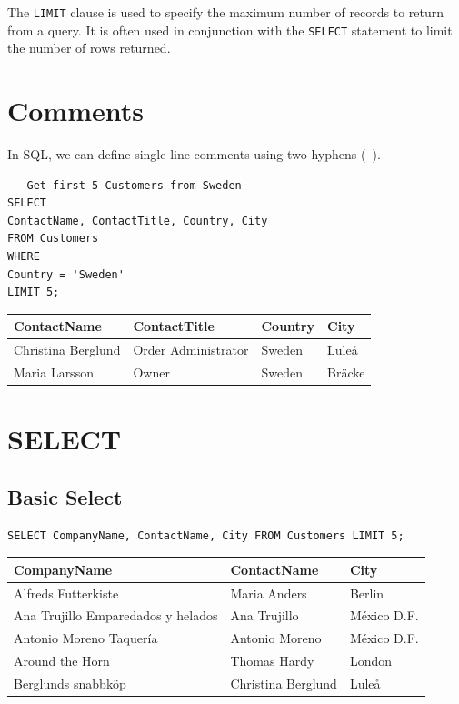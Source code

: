 \documentclass[10pt]{article}
\begin{document}
The \texttt{LIMIT} clause is used to specify the maximum number of records to return from a query. 
It is often used in conjunction with the \texttt{SELECT} statement to limit the number of rows returned.


\section{Comments}

In SQL, we can define single-line comments using two hyphens (\texttt{--}).

\begin{verbatim}
-- Get first 5 Customers from Sweden
SELECT 
ContactName, ContactTitle, Country, City 
FROM Customers 
WHERE
Country = 'Sweden'
LIMIT 5;
\end{verbatim}

\begin{table}[H]
\begin{tabular}{|l|l|l|l|}
\hline
ContactName & ContactTitle & Country & City \\
\hline
Christina Berglund & Order Administrator & Sweden & Luleå \\
Maria Larsson & Owner & Sweden & Bräcke \\
\hline
\end{tabular}
\end{table}


\section{SELECT}

\subsection{Basic Select}
\begin{verbatim}
SELECT CompanyName, ContactName, City FROM Customers LIMIT 5;
\end{verbatim}

\begin{table}[H]
\begin{tabular}{|l|l|l|}
\hline
CompanyName	& ContactName	& City \\
\hline
Alfreds Futterkiste	& Maria Anders	& Berlin \\
Ana Trujillo Emparedados y helados	& Ana Trujillo	& México D.F. \\
Antonio Moreno Taquería	& Antonio Moreno	& México D.F. \\
Around the Horn	& Thomas Hardy	& London \\
Berglunds snabbköp	& Christina Berglund	& Luleå \\
\hline
\end{tabular}
\end{table}
\end{document}
